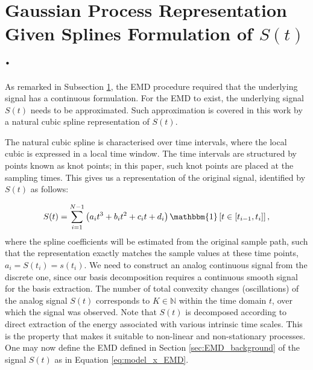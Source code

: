 \section{Gaussian Process Representation Given Splines Formulation of $S(t)$.}
As remarked in Subsection \ref{}, the EMD procedure required that the underlying signal has a continuous formulation. For the EMD to exist, the underlying signal $S(t)$ needs to be approximated. Such approximation is covered in this work by a natural cubic spline representation of $S(t)$.

The natural cubic spline is characterised over time intervals, where the local cubic is expressed in a local time window. The time intervals are structured by points known as knot points; in this paper, such knot points are placed at the sampling times. This gives us a representation of the original signal, identified by $S(t)$ as follows:

\begin{equation}
\label{cubic_spl}
S(t) = \sum_{i=1}^{N-1} \left(a_i t^3 +b_i t^2 + c_i t +d_i \right) \mathbbm{1} \left[ t \in \left[ t_{i-1},t_i \right] \right],
\end{equation} 
where the spline coefficients will be estimated from the original sample path, such that the representation exactly matches the sample values at these time points, $a_i = S(t_i) = s(t_i)$. We need to construct an analog continuous signal from the discrete one, since our basis decomposition requires a continuous smooth signal for the basis extraction. The number of total convexity changes (oscillations) of the analog signal $S(t)$ corresponds to $K \in \mathbb{N}$ within the time domain $t$, over which the signal was observed. Note that $S(t)$ is decomposed according to direct extraction of the energy associated with various intrinsic time scales. This is the property that makes it suitable to non-linear and non-stationary processes. One may now define the EMD defined in Section \ref{sec:EMD_background} of the signal $S(t)$ as in Equation \eqref{eq:model_x_EMD}.


